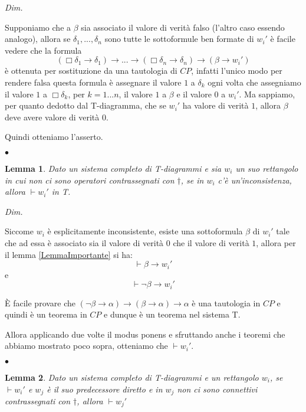 \documentclass[a4paper, titlepage, 12pt]{report}
\newtheorem{lemma}{Lemma}[chapter]
\newenvironment{proof}
    {\textit{Dim.}
    }
    {\begin{flushright}$\bullet$\end{flushright}
    }
\begin{document}
\begin{proof}

Supponiamo che a $\beta$ sia associato il valore di verità falso
(l'altro caso essendo analogo),
allora se $\delta_1, ..., \delta_n$ sono tutte le sottoformule ben formate di $w_i'$ è
facile vedere che la formula
$$(\Box \delta_1 \rightarrow \delta_1) \rightarrow ... \rightarrow (\Box \delta_n \rightarrow \delta_n) \rightarrow (\beta \rightarrow w_i')$$
è ottenuta per sostituzione da una tautologia di $CP$, infatti l'unico modo per rendere
falsa questa formula è assegnare il valore $1$ a $\delta_k$ ogni volta che
assegniamo il valore $1$ a $\Box \delta_k$,
per $k = 1 ... n$, il valore $1$ a $\beta$ e il valore $0$ a $w_i'$.
Ma sappiamo, per quanto dedotto dal T-diagramma,
che se $w_i'$ ha valore di verità $1$,
allora $\beta$ deve avere valore di verità $0$.

Quindi otteniamo l'asserto.

\end{proof}


\begin{lemma}
Dato un sistema completo di T-diagrammi e sia $w_i$ un suo rettangolo in cui
non ci sono operatori contrassegnati con $\dagger$,
se in $w_i$ c'è un'inconsistenza, allora $\vdash w_i'$ in T.
\end{lemma}

\begin{proof}

Siccome $w_i$ è esplicitamente inconsistente, esiste una sottoformula $\beta$ di $w_i'$
tale che ad essa è associato sia il valore di verità $0$ che il valore di verità $1$,
allora per il lemma \ref{LemmaImportante} si ha:
$$\vdash \beta \rightarrow w_i'$$
e
$$\vdash \neg \beta \rightarrow w_i'$$

È facile provare che
$(\neg \beta \rightarrow \alpha) \rightarrow (\beta \rightarrow \alpha) \rightarrow \alpha$
è una tautologia in $CP$ e quindi è un teorema in $CP$ e dunque è un teorema nel sistema T.

Allora applicando due volte il modus ponens e sfruttando anche i teoremi che abbiamo mostrato poco sopra,
otteniamo che $\vdash w_i'$.

\end{proof}


\begin{lemma}
Dato un sistema completo di T-diagrammi e un rettangolo $w_i$, se $\vdash w_i'$
e $w_j$ è il suo predecessore diretto e in $w_j$ non ci sono connettivi contrassegnati
con $\dagger$,
allora $\vdash w_j'$
\end{lemma}
\end{document}
